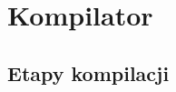 \documentclass[declaration,shortabstract]{iithesis}
\begin{document}





\chapter{Kompilator}
\section{Etapy kompilacji}
\end{document}
